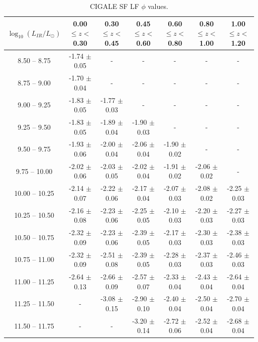 \begin{table}
    \begin{center}
    \caption{CIGALE SF LF $\phi$ values.}
    \label{Tab: CG SF LF}
    \begin{tabular}{@{}ccccccc@{}}
        \toprule
        $\log_{10}(L_{IR}/L_{\odot})$ & 0.00 $\leq z <$ 0.30 & 0.30 $\leq z <$ 0.45 & 0.45 $\leq z <$ 0.60 & 0.60 $\leq z <$ 0.80 & 0.80 $\leq z <$ 1.00 & 1.00 $\leq z <$ 1.20 \\
        \hline
         8.50 --  8.75 & -1.74 $\pm$ 0.05   & - & - & - & - & - \\
         8.75 --  9.00 & -1.70 $\pm$ 0.04   & - & - & - & - & - \\
         9.00 --  9.25 & -1.83 $\pm$ 0.05   & -1.77 $\pm$ 0.03  & - & - & - & - \\
         9.25 --  9.50 & -1.83 $\pm$ 0.05   & -1.89 $\pm$ 0.04  & -1.90 $\pm$ 0.03  & - & - & - \\
         9.50 --  9.75 & -1.93 $\pm$ 0.06   & -2.00 $\pm$ 0.04  & -2.06 $\pm$ 0.04  & -1.90 $\pm$ 0.02  & - & - \\
         9.75 -- 10.00 & -2.02 $\pm$ 0.06   & -2.03 $\pm$ 0.05  & -2.02 $\pm$ 0.04  & -1.91 $\pm$ 0.02  & -2.06 $\pm$ 0.02  & - \\
        10.00 -- 10.25 & -2.14 $\pm$ 0.07   & -2.22 $\pm$ 0.06  & -2.17 $\pm$ 0.04  & -2.07 $\pm$ 0.03  & -2.08 $\pm$ 0.02  & -2.25 $\pm$ 0.03 \\
        10.25 -- 10.50 & -2.16 $\pm$ 0.08   & -2.23 $\pm$ 0.06  & -2.25 $\pm$ 0.05  & -2.10 $\pm$ 0.03  & -2.20 $\pm$ 0.03  & -2.27 $\pm$ 0.03 \\
        10.50 -- 10.75 & -2.32 $\pm$ 0.09   & -2.23 $\pm$ 0.06  & -2.39 $\pm$ 0.05  & -2.17 $\pm$ 0.03  & -2.30 $\pm$ 0.03  & -2.38 $\pm$ 0.03 \\
        10.75 -- 11.00 & -2.32 $\pm$ 0.09   & -2.51 $\pm$ 0.08  & -2.39 $\pm$ 0.05  & -2.28 $\pm$ 0.03  & -2.37 $\pm$ 0.03  & -2.46 $\pm$ 0.03 \\
        11.00 -- 11.25 & -2.64 $\pm$ 0.13   & -2.66 $\pm$ 0.09  & -2.57 $\pm$ 0.07  & -2.33 $\pm$ 0.04  & -2.43 $\pm$ 0.04  & -2.64 $\pm$ 0.04 \\
        11.25 -- 11.50 & -                  & -3.08 $\pm$ 0.15  & -2.90 $\pm$ 0.10  & -2.40 $\pm$ 0.04  & -2.50 $\pm$ 0.04  & -2.70 $\pm$ 0.04 \\
        11.50 -- 11.75 & -                  & -                 & -3.20 $\pm$ 0.14  & -2.72 $\pm$ 0.06  & -2.52 $\pm$ 0.04  & -2.68 $\pm$ 0.04 \\

\end{tabular}
\end{center}
\end{table}
